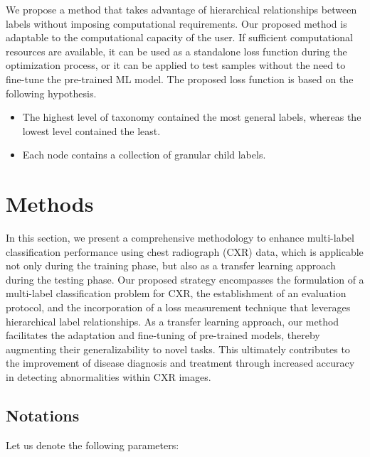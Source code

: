 \documentclass[preprint,3p,times, review]{elsarticle}
\begin{document}
We propose a method that takes advantage of hierarchical relationships between labels without imposing computational requirements. Our proposed method is adaptable to the computational capacity of the user. If sufficient computational resources are available, it can be used as a standalone loss function during the optimization process, or it can be applied to test samples without the need to fine-tune the pre-trained ML model. The proposed loss function is based on the following hypothesis.

\begin{itemize}
    \item  The highest level of taxonomy contained the most general labels, whereas the lowest level contained the least.
    \item  Each node contains a collection of granular child labels.
\end{itemize}


\section{Methods}
In this section, we present a comprehensive methodology to enhance multi-label classification performance using chest radiograph (CXR) data, which is applicable not only during the training phase, but also as a transfer learning approach during the testing phase. Our proposed strategy encompasses the formulation of a multi-label classification problem for CXR, the establishment of an evaluation protocol, and the incorporation of a loss measurement technique that leverages hierarchical label relationships. As a transfer learning approach, our method facilitates the adaptation and fine-tuning of pre-trained models, thereby augmenting their generalizability to novel tasks. This ultimately contributes to the improvement of disease diagnosis and treatment through increased accuracy in detecting abnormalities within CXR images.



\subsection{Notations}
Let us denote the following parameters:
\end{document}
